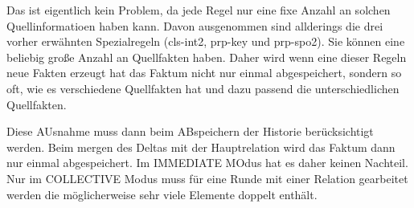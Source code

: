 Das ist eigentlich kein Problem, da jede Regel nur eine fixe Anzahl an solchen Quellinformatioen haben kann. Davon ausgenommen sind allderings die drei vorher erwähnten Spezialregeln (cls-int2, prp-key und prp-spo2). Sie können eine beliebig große Anzahl an Quellfakten haben. Daher wird wenn eine dieser Regeln neue Fakten erzeugt hat das Faktum nicht nur einmal abgespeichert, sondern so oft, wie es verschiedene Quellfakten hat und dazu passend die unterschiedlichen Quellfakten.

Diese AUsnahme muss dann beim ABspeichern der Historie berücksichtigt werden. Beim mergen des Deltas mit der Hauptrelation wird das Faktum dann nur einmal abgespeichert. Im IMMEDIATE MOdus hat es daher keinen Nachteil. Nur im COLLECTIVE Modus muss für eine Runde mit einer Relation gearbeitet werden die möglicherweise sehr viele Elemente doppelt enthält.